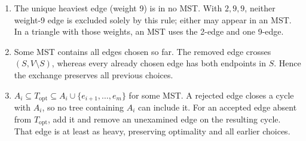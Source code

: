 \documentclass[11pt,letterpaper]{article}
\begin{document}
\begin{enumerate}
 \item The unique heaviest edge (weight 9) is in no MST. With $2,9,9$, neither weight-9 edge is excluded solely by this rule; either may appear in an MST. In a triangle with those weights, an MST uses the 2-edge and one 9-edge.
 \item Some MST contains all edges chosen so far. The removed edge crosses $(S,V\setminus S)$, whereas every already chosen edge has both endpoints in $S$. Hence the exchange preserves all previous choices.
 \item $A_i\subseteq T_{\mathrm{opt}}\subseteq A_i\cup\{e_{i+1},\ldots,e_m\}$ for some MST. A rejected edge closes a cycle with $A_i$, so no tree containing $A_i$ can include it. For an accepted edge absent from $T_{\mathrm{opt}}$, add it and remove an unexamined edge on the resulting cycle. That edge is at least as heavy, preserving optimality and all earlier choices.
\end{enumerate}

\newpage
\end{document}
